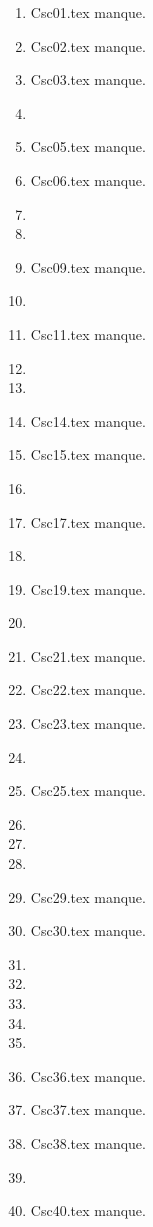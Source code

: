 \clearpage 
{}
\begin{enumerate}
  \item Csc01.tex manque. 
  \item Csc02.tex manque. 
  \item Csc03.tex manque. 
  \item  
  \item Csc05.tex manque. 
  \item Csc06.tex manque. 
  \item  
  \item  
  \item Csc09.tex manque. 
  \item  
  \item Csc11.tex manque. 
  \item  
  \item  
  \item Csc14.tex manque. 
  \item Csc15.tex manque. 
  \item  
  \item Csc17.tex manque. 
  \item  
  \item Csc19.tex manque. 
  \item  
  \item Csc21.tex manque. 
  \item Csc22.tex manque. 
  \item Csc23.tex manque. 
  \item  
  \item Csc25.tex manque. 
  \item  
  \item  
  \item  
  \item Csc29.tex manque. 
  \item Csc30.tex manque. 
  \item  
  \item  
  \item  
  \item  
  \item  
  \item Csc36.tex manque. 
  \item Csc37.tex manque. 
  \item Csc38.tex manque. 
  \item  
  \item Csc40.tex manque. 
\end{enumerate} 
